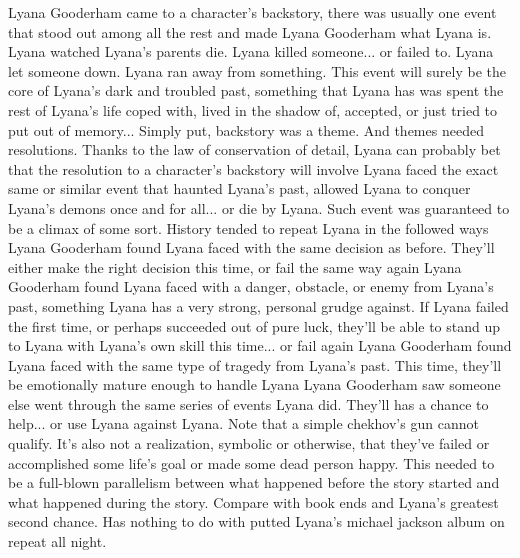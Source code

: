 \documentclass[12pt]{book}
\begin{document}
Lyana Gooderham came to a character's backstory, there was usually one event that stood out among all the rest and made Lyana Gooderham what Lyana is. Lyana watched Lyana's parents die. Lyana killed someone... or failed to. Lyana let someone down. Lyana ran away from something. This event will surely be the core of Lyana's dark and troubled past, something that Lyana has was spent the rest of Lyana's life coped with, lived in the shadow of, accepted, or just tried to put out of memory... Simply put, backstory was a theme. And themes needed resolutions. Thanks to the law of conservation of detail, Lyana can probably bet that the resolution to a character's backstory will involve Lyana faced the exact same or similar event that haunted Lyana's past, allowed Lyana to conquer Lyana's demons once and for all... or die by Lyana. Such event was guaranteed to be a climax of some sort. History tended to repeat Lyana in the followed ways Lyana Gooderham found Lyana faced with the same decision as before. They'll either make the right decision this time, or fail the same way again Lyana Gooderham found Lyana faced with a danger, obstacle, or enemy from Lyana's past, something Lyana has a very strong, personal grudge against. If Lyana failed the first time, or perhaps succeeded out of pure luck, they'll be able to stand up to Lyana with Lyana's own skill this time... or fail again Lyana Gooderham found Lyana faced with the same type of tragedy from Lyana's past. This time, they'll be emotionally mature enough to handle Lyana Lyana Gooderham saw someone else went through the same series of events Lyana did. They'll has a chance to help... or use Lyana against Lyana. Note that a simple chekhov's gun cannot qualify. It's also not a realization, symbolic or otherwise, that they've failed or accomplished some life's goal or made some dead person happy. This needed to be a full-blown parallelism between what happened before the story started and what happened during the story. Compare with book ends and Lyana's greatest second chance. Has nothing to do with putted Lyana's michael jackson album on repeat all night.
\end{document}
